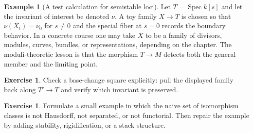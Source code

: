 \documentclass[11pt]{amsart}
\theoremstyle{definition}
\newtheorem{example}[theorem]{Example}
\newtheorem{exercise}[theorem]{Exercise}
\newcommand{\Spec}{\operatorname{Spec}}
\begin{document}
\begin{example}[A test calculation for semistable loci]
Let $T=\Spec k[s]$ and let the invariant of interest be denoted $\nu$.  A toy family $X\to T$ is chosen so that $\nu(X_t)=\nu_0$ for $s\ne0$ and the special fiber at $s=0$ records the boundary behavior.  In a concrete course one may take $X$ to be a family of divisors, modules, curves, bundles, or representations, depending on the chapter.  The moduli-theoretic lesson is that the morphism $T\to M$ detects both the general member and the limiting point.
\end{example}
\begin{exercise}
Check a base-change square explicitly: pull the displayed family back along $T\prime\to T$ and verify which invariant is preserved.
\end{exercise}
\begin{exercise}
Formulate a small example in which the naive set of isomorphism classes is not Hausdorff, not separated, or not functorial.  Then repair the example by adding stability, rigidification, or a stack structure.
\end{exercise}
\clearpage
\end{document}
